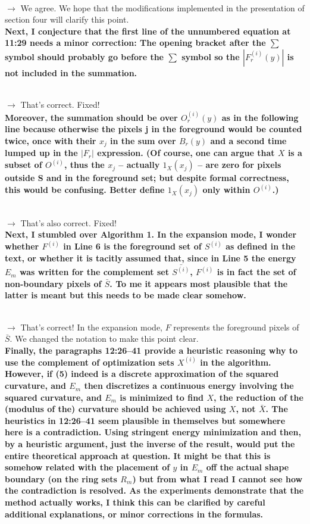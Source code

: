 \documentclass[12pt]{article}
\begin{document}
~\\
$\rightarrow$ We agree. We hope that the modifications implemented in the presentation of section four will clarify this point.
~\\


\textbf{Next, I conjecture that the first line of the unnumbered equation at 11:29
needs a minor correction: The opening bracket after the $\sum$ symbol should
probably go before the $\sum$ symbol so the $|F_r^{(i)}(y)|$ is not included in the summation. }

~\\
$\rightarrow$ That's correct. Fixed!
~\\

\textbf{Moreover, the summation should be over $O_r^{(i)}(y)$ as in the following line because otherwise the pixels j in the foreground would be counted twice, once with their $x_j$ in the sum over $B_r(y)$ and a second time lumped up in the $|F_r|$ expression. (Of course, one can argue that $X$ is a subset of $O^{(i)}$, thus the $x_j$ -- actually $1_X(x_j)$ -- are zero for pixels outside S and in the foreground set; but despite formal correctness, this would be confusing. Better define $1_X(x_j)$ only within $O^{(i)}$.) }

~\\
$\rightarrow$ That's also correct. Fixed!
~\\


\textbf{Next, I stumbled over Algorithm 1. In the expansion mode, I wonder whether $F^{(i)}$ in Line 6 is the foreground set of $S^{(i)}$ as defined in the text, or whether it is tacitly assumed that, since in Line 5 the energy $E_m$ was written for the complement set $\bar{S^{(i)}}$, $F^{(i)}$ is in fact the set of non-boundary pixels of $\bar{S}$. To me it appears most plausible that the latter is meant but this needs to be made clear somehow.}

~\\
$\rightarrow$ That's correct! In the expansion mode, $F$ represents the foreground pixels of $\bar{S}$. We changed the notation to make this point clear.
~\\



\textbf{Finally, the paragraphs 12:26--41 provide a heuristic reasoning why to use the complement of optimization sets $X^{(i)}$ in the algorithm. However, if (5) indeed is a discrete approximation of the squared curvature, and $E_m$ then discretizes a continuous energy involving the squared curvature, and $E_m$ is minimized to find $X$, the reduction of the (modulus of the) curvature should be achieved using $X$, not $\bar{X}$. The heuristics in 12:26--41 seem plausible in themselves but somewhere here is a contradiction. Using stringent energy minimization and then, by a heuristic argument, just the inverse of the result, would put the entire theoretical approach at question. It might be that this is somehow related with the placement of $y$ in $E_m$ off the actual shape boundary (on the ring sets $R_m$) but from what I read I cannot see how the contradiction is resolved. As the experiments demonstrate that the method actually works, I think this can be clarified by careful additional explanations, or minor corrections in the formulas.}
\end{document}
